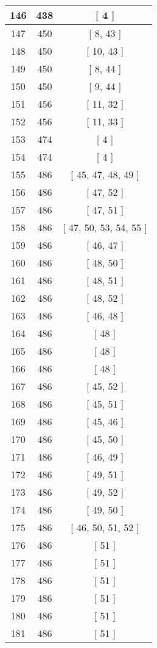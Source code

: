 \begin{center}
\begin{longtable}[H]{|| c c c ||}
\hline
146 & 438 & [ 4 ] \\ 
\hline
147 & 450 & [ 8, 43 ] \\ 
\hline
148 & 450 & [ 10, 43 ] \\ 
\hline
149 & 450 & [ 8, 44 ] \\ 
\hline
150 & 450 & [ 9, 44 ] \\ 
\hline
151 & 456 & [ 11, 32 ] \\ 
\hline
152 & 456 & [ 11, 33 ] \\ 
\hline
153 & 474 & [ 4 ] \\ 
\hline
154 & 474 & [ 4 ] \\ 
\hline
155 & 486 & [ 45, 47, 48, 49 ] \\ 
\hline
156 & 486 & [ 47, 52 ] \\ 
\hline
157 & 486 & [ 47, 51 ] \\ 
\hline
158 & 486 & [ 47, 50, 53, 54, 55 ] \\ 
\hline
159 & 486 & [ 46, 47 ] \\ 
\hline
160 & 486 & [ 48, 50 ] \\ 
\hline
161 & 486 & [ 48, 51 ] \\ 
\hline
162 & 486 & [ 48, 52 ] \\ 
\hline
163 & 486 & [ 46, 48 ] \\ 
\hline
164 & 486 & [ 48 ] \\ 
\hline
165 & 486 & [ 48 ] \\ 
\hline
166 & 486 & [ 48 ] \\ 
\hline
167 & 486 & [ 45, 52 ] \\ 
\hline
168 & 486 & [ 45, 51 ] \\ 
\hline
169 & 486 & [ 45, 46 ] \\ 
\hline
170 & 486 & [ 45, 50 ] \\ 
\hline
171 & 486 & [ 46, 49 ] \\ 
\hline
172 & 486 & [ 49, 51 ] \\ 
\hline
173 & 486 & [ 49, 52 ] \\ 
\hline
174 & 486 & [ 49, 50 ] \\ 
\hline
175 & 486 & [ 46, 50, 51, 52 ] \\ 
\hline
176 & 486 & [ 51 ] \\ 
\hline
177 & 486 & [ 51 ] \\ 
\hline
178 & 486 & [ 51 ] \\ 
\hline
179 & 486 & [ 51 ] \\ 
\hline
180 & 486 & [ 51 ] \\ 
\hline
181 & 486 & [ 51 ] \\ 

\end{longtable}
\end{center}
